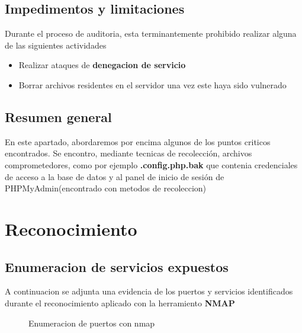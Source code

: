 \documentclass[a4paper]{article} %
\begin{document}
  \subsection{Impedimentos y limitaciones}

  Durante el proceso de auditoria, esta terminantemente prohibido realizar alguna de las siguientes actividades
  
  \begin{itemize}
    
    \item Realizar ataques de \textbf{denegacion de servicio}
    \item Borrar archivos residentes en el servidor una vez este haya sido vulnerado
  \end{itemize}

  \subsection{Resumen general}
  En este apartado, abordaremos por encima algunos de los puntos criticos encontrados.
  Se encontro, mediante tecnicas de recolección, archivos comprometedores, como por ejemplo \textbf{.config.php.bak} que contenia credenciales de acceso a la base de datos y al panel de inicio de sesión de PHPMyAdmin(encontrado con metodos de recoleccion)

  \clearpage

  \section{Reconocimiento}
  \subsection{Enumeracion de servicios expuestos}
  A continuacion se adjunta una evidencia de los puertos y servicios identificados durante el reconocimiento aplicado con la herramiento \textbf{NMAP}
  
  \vspace{0.3cm}

   \begin{figure}[h]

    \centering
    \setlength{\fboxrule}{1.8pt}
      \caption{Enumeracion de puertos con nmap}
  \end{figure}
  
\end{document}
